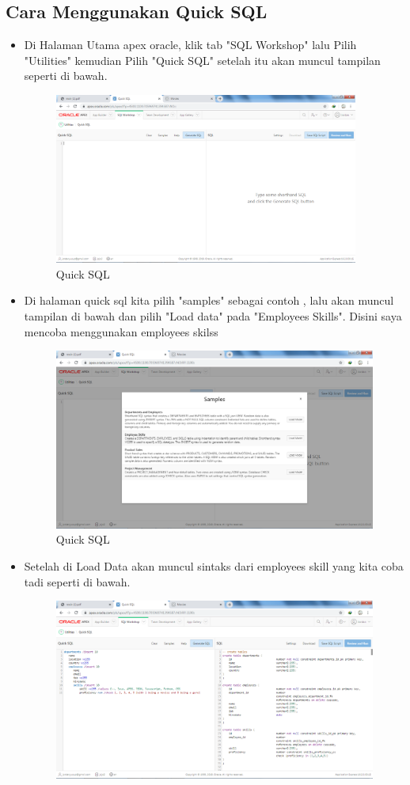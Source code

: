 \documentclass[12pt, times new roman]{article}
\begin{document}
\subsection{Cara Menggunakan Quick SQL}
\begin{itemize}
\item Di Halaman Utama apex oracle, klik tab "SQL Workshop" lalu Pilih "Utilities" kemudian Pilih "Quick SQL" setelah itu akan muncul tampilan seperti di bawah.
\begin{figure}[!htpb]
	\centering
	\includegraphics[width=10cm]{figures/Screenshot_11.png}
	\caption{Quick SQL}
\end{figure}
\item Di halaman quick sql kita pilih "samples" sebagai contoh , lalu akan muncul tampilan di bawah dan pilih "Load data" pada "Employees Skills". Disini saya mencoba menggunakan employees skilss
\begin{figure}[!htpb]
	\centering
	\includegraphics[width=11cm]{figures/Screenshot_12.png}
	\caption{Quick SQL}
\end{figure}
\item Setelah di Load Data akan muncul sintaks dari employees skill yang kita coba tadi seperti di bawah.
\begin{figure}[!htpb]
	\centering
	\includegraphics[width=12.5cm]{figures/Screenshot_13.png}

\end{figure}
\end{itemize}
\end{document}
